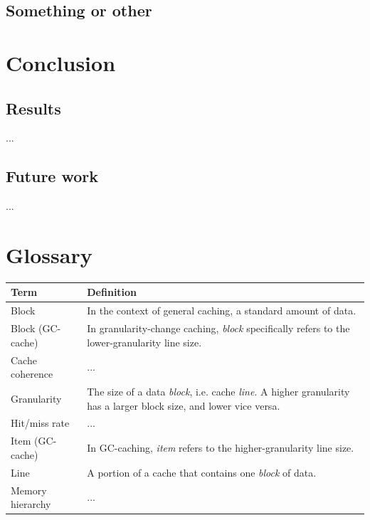 \documentclass[12pt,twoside]{reedthesis}
\begin{document}
\section{Something or other}

\chapter{Conclusion}

\section{Results}

...

\section{Future work}

...

\appendix
\chapter{Glossary}

\def\arraystretch{1.5}
\begin{tabular}{p{1.5in}p{3.8in}}
    \hline
    \textbf{Term}       & \textbf{Definition} \\
    \hline
	Block               & In the context of general caching, a standard amount of data. \\
	Block (GC-cache)	& In granularity-change caching, \textit{block} specifically refers to the lower-granularity line size. \\
	Cache coherence		& ... \\
	Granularity         & The size of a data \textit{block}, i.e. cache \textit{line}. A higher granularity has a larger block size, and lower vice versa. \\
	Hit/miss rate 		& ... \\
    Item (GC-cache)  	& In GC-caching, \textit{item} refers to the higher-granularity line size. \\
    Line                & A portion of a cache that contains one \textit{block} of data. \\
	Memory hierarchy	& ... \\
\end{tabular}
\end{document}
